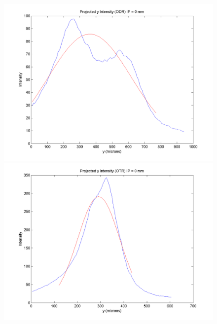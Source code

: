 \documentclass[12pt]{article}
\begin{document}
\begin{figure}
\begin{center}
\includegraphics[scale=0.5]{Figures/ProjY_ODR_0.PNG}
\includegraphics[scale=0.5]{Figures/ProjY_OTR_0.PNG}
\caption{}
\end{center}
\end{figure}
\end{document}
